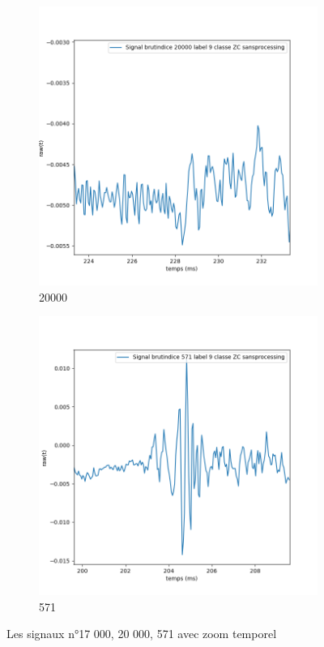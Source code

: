 \begin{figure}[!h]
\begin{subfigure}[b]{0.3\textwidth}
    \includegraphics[width=\textwidth]{./images/indice20000Spectro1Dlabel9classeZCsansprocessingaveczoom.png}
  \caption{20000}
  \end{subfigure}
  \begin{subfigure}[b]{0.3\textwidth}
    \includegraphics[width=\textwidth]{./images/indice571Spectro1Dlabel9classeZCsansprocessingaveczoom.png}
  \caption{571}
  \end{subfigure}
  \caption{Les signaux n°17 000, 20 000, 571 avec zoom temporel}
\end{figure}

